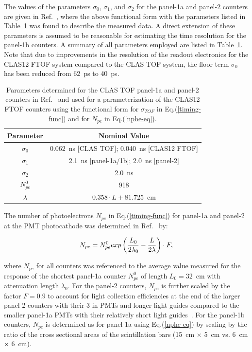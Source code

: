 \documentclass{elsart}
\begin{document}
The values of the parameters $\sigma_0$, $\sigma_1$, and $\sigma_2$ for the panel-1a and panel-2
counters are given in Ref.~\cite{tof-nim}, where the above functional form with the parameters listed
in Table~\ref{timing-parms} was found to describe the measured data. A direct extension of these
parameters is assumed to be reasonable for estimating the time resolution for the panel-1b counters.
A summary of all parameters employed are listed in Table~\ref{timing-parms}. Note that due to
improvements in the resolution of the readout electronics for the CLAS12 FTOF system compared to
the CLAS TOF system, the floor-term $\sigma_0$ has been reduced from 62~ps to 40~ps. 

\begin{table}[htbp]
\begin{center}
\begin{tabular} {c|c} \hline
Parameter    & Nominal Value\\ \hline
$\sigma_0$ & 0.062~ns [CLAS TOF]; 0.040~ns [CLAS12 FTOF] \\ \hline
$\sigma_1$  & 2.1~ns [panel-1a/1b]; 2.0~ns [panel-2] \\ \hline
$\sigma_2$  & 2.0~ns \\ \hline
$N_{pe}^0$   & 918 \\ \hline
$\lambda$   & $0.358\cdot L + 81.725$~cm \\ \hline
\end{tabular}
\caption{Parameters determined for the CLAS TOF panel-1a and panel-2 counters in Ref.~\cite{tof-nim}
and used for a parameterization of the CLAS12 FTOF counters using the functional form for $\sigma_{TOF}$
in Eq.(\ref{timing-func}) and for $N_{pe}$ in Eq.(\ref{nphe-eq}).}
\label{timing-parms}
\end{center}
\end{table}

The number of photoelectrons $N_{pe}$ in Eq.(\ref{timing-func}) for panel-1a and panel-2 at the PMT
photocathode was determined in Ref.~\cite{tof-nim} by:

\begin{equation}
\label{nphe-eq}
N_{pe} = N_{pe}^0 {\rm exp} \left( \frac{L_0}{2 \lambda_0} - \frac{L}{2 \lambda} \right) \cdot F,
\end{equation}

\noindent
where $N_{pe}$ for all counters was referenced to the average value measured for the response of
the shortest panel-1a counter $N_{pe}^0$ of length $L_0=32$~cm with attenuation length $\lambda_0$.
For the panel-2 counters, $N_{pe}$ is further scaled by the factor $F = 0.9$ to account for light
collection efficiencies at the end of the larger panel-2 counters with their 3-in PMTs and longer light
guides compared to the smaller panel-1a PMTs with their relatively short light guides~\cite{tof-nim}. For
the panel-1b counters, $N_{pe}$ is determined as for panel-1a using Eq.(\ref{nphe-eq}) by scaling by the
ratio of the cross sectional areas of the scintillation bars (15~cm $\times$ 5~cm vs. 6~cm $\times$ 6~cm). 
\end{document}
